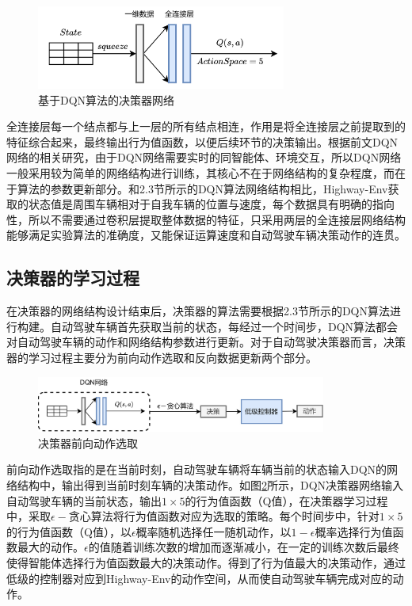 \begin{figure}[htbp]
    \vspace{13pt}
    \centering
    \includegraphics[width=0.73\textwidth]{images/chapter3/highway_decision.png}
    \caption{基于DQN算法的决策器网络}\label{DQN算法的决策器网络} %
\end{figure}  

全连接层每一个结点都与上一层的所有结点相连，作用是将全连接层之前提取到的特征综合起来，最终输出行为值函数，以便后续环节的决策输出。根据前文DQN网络的相关研究，由于DQN网络需要实时的同智能体、环境交互，所以DQN网络一般采用较为简单的网络结构进行训练，其核心不在于网络结构的复杂程度，而在于算法的参数更新部分。和2.3节所示的DQN算法网络结构相比，Highway-Env获取的状态值是周围车辆相对于自我车辆的位置与速度，每个数据具有明确的指向性，所以不需要通过卷积层提取整体数据的特征，只采用两层的全连接层网络结构能够满足实验算法的准确度，又能保证运算速度和自动驾驶车辆决策动作的连贯。

\subsection{决策器的学习过程}

在决策器的网络结构设计结束后，决策器的算法需要根据2.3节所示的DQN算法进行构建。自动驾驶车辆首先获取当前的状态，每经过一个时间步，DQN算法都会对自动驾驶车辆的动作和网络结构参数进行更新。对于自动驾驶决策器而言，决策器的学习过程主要分为前向动作选取和反向数据更新两个部分。

\begin{figure}[htbp]
    \vspace{13pt}
    \centering
    \includegraphics[width=0.85\textwidth]{images/chapter3/highway_forward.png}
    \caption{决策器前向动作选取}\label{决策器前向} %
\end{figure}  

前向动作选取指的是在当前时刻，自动驾驶车辆将车辆当前的状态输入DQN的网络结构中，输出得到当前时刻车辆的决策动作。如图\ref{决策器前向}所示，DQN决策器网络输入自动驾驶车辆的当前状态，输出$1 \times 5$的行为值函数（Q值），在决策器学习过程中，采取$\epsilon-$贪心算法将行为值函数对应为选取的策略。每个时间步中，针对$1 \times 5$的行为值函数（Q值），以$\epsilon$概率随机选择任一随机动作，以$1-\epsilon$概率选择行为值函数最大的动作。$\epsilon$的值随着训练次数的增加而逐渐减小，在一定的训练次数后最终使得智能体选择行为值函数最大的决策动作。得到了行为值最大的决策动作，通过低级的控制器对应到Highway-Env的动作空间，从而使自动驾驶车辆完成对应的动作。

